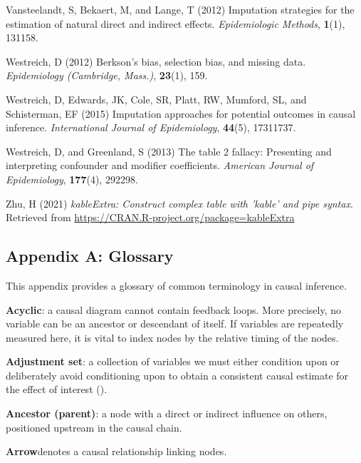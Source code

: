 \documentclass[
  singlecolumn]{article}
\newlength{\cslhangindent}
\newenvironment{CSLReferences}[2] %
 {\begin{list}{}{%
  \setlength{\itemindent}{0pt}
  \setlength{\leftmargin}{0pt}
  \setlength{\parsep}{0pt}
  \ifodd #1
   \setlength{\leftmargin}{\cslhangindent}
   \setlength{\itemindent}{-1\cslhangindent}
  \fi
  \setlength{\itemsep}{#2\baselineskip}}}
 {\end{list}}
\begin{document}
\begin{CSLReferences}{1}{0}
Vansteelandt, S, Bekaert, M, and Lange, T (2012) Imputation strategies
for the estimation of natural direct and indirect effects.
\emph{Epidemiologic Methods}, \textbf{1}(1), 131158.

Westreich, D (2012) Berkson's bias, selection bias, and missing data.
\emph{Epidemiology (Cambridge, Mass.)}, \textbf{23}(1), 159.

Westreich, D, Edwards, JK, Cole, SR, Platt, RW, Mumford, SL, and
Schisterman, EF (2015) Imputation approaches for potential outcomes in
causal inference. \emph{International Journal of Epidemiology},
\textbf{44}(5), 17311737.

Westreich, D, and Greenland, S (2013) The table 2 fallacy: Presenting
and interpreting confounder and modifier coefficients. \emph{American
Journal of Epidemiology}, \textbf{177}(4), 292298.

Zhu, H (2021) \emph{kableExtra: Construct complex table with 'kable' and
pipe syntax}. Retrieved from
\url{https://CRAN.R-project.org/package=kableExtra}

\end{CSLReferences}

\newpage{}

\subsection{Appendix A: Glossary}\label{appendix-a}

This appendix provides a glossary of common terminology in causal
inference.

\textbf{Acyclic}: a causal diagram cannot contain feedback loops. More
precisely, no variable can be an ancestor or descendant of itself. If
variables are repeatedly measured here, it is vital to index nodes by
the relative timing of the nodes.

\textbf{Adjustment set}: a collection of variables we must either
condition upon or deliberately avoid conditioning upon to obtain a
consistent causal estimate for the effect of interest
().

\textbf{Ancestor (parent)}: a node with a direct or indirect influence
on others, positioned upstream in the causal chain.

\textbf{Arrow}denotes a causal relationship linking nodes.
\end{document}
